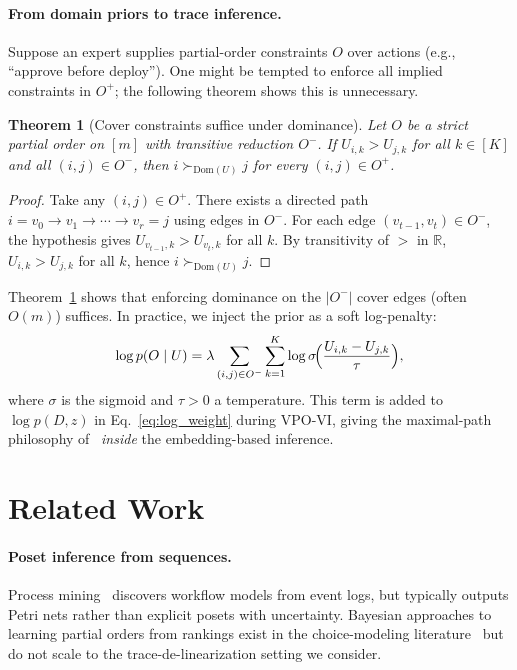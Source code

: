\documentclass{article}
\newtheorem{theorem}{Theorem}
\theoremstyle{definition}
\theoremstyle{remark}
\newcommand{\R}{\mathbb{R}}
\newcommand{\Dom}{\mathrm{Dom}}
\begin{document}
\paragraph{From domain priors to trace inference.}
Suppose an expert supplies partial-order constraints $O$ over actions
(e.g., ``approve before deploy'').
One might be tempted to enforce all implied constraints in $O^+$;
the following theorem shows this is unnecessary.

\begin{theorem}[Cover constraints suffice under dominance]
\label{thm:cover}
Let $O$ be a strict partial order on $[m]$ with transitive reduction
$O^-$.
If $U_{i,k}>U_{j,k}$ for all $k\in[K]$ and all $(i,j)\in O^-$,
then $i\succ_{\Dom(U)}j$ for every $(i,j)\in O^+$.
\end{theorem}
\begin{proof}
Take any $(i,j)\in O^+$.
There exists a directed path $i=v_0\to v_1\to\cdots\to v_r=j$
using edges in $O^-$.
For each edge $(v_{t-1},v_t)\in O^-$, the hypothesis gives
$U_{v_{t-1},k}>U_{v_t,k}$ for all $k$.
By transitivity of $>$ in $\R$,
$U_{i,k}>U_{j,k}$ for all $k$, hence $i\succ_{\Dom(U)}j$.
\end{proof}

Theorem~\ref{thm:cover} shows that enforcing dominance on the
$|O^-|$ cover edges (often $O(m)$) suffices.
In practice, we inject the prior as a soft log-penalty:
\begin{equation}
\log p(O\mid U)
= \lambda\sum_{(i,j)\in O^-}\sum_{k=1}^K
\log\sigma\!\Bigl(\frac{U_{i,k}-U_{j,k}}{\tau}\Bigr),
\label{eq:soft_prior}
\end{equation}
where $\sigma$ is the sigmoid and $\tau>0$ a temperature.
This term is added to $\log p(D,z)$ in Eq.~\eqref{eq:log_weight}
during VPO-VI, giving the maximal-path
philosophy of~\citet{ban2024differentiable} \emph{inside}
the embedding-based inference.

\section{Related Work}
\label{sec:related}

\paragraph{Poset inference from sequences.}
Process mining~\citep{vanderaalst2016process,leemans2013discovering,weijters2006process}
discovers workflow models from event logs, but typically outputs Petri nets
rather than explicit posets with uncertainty.
Bayesian approaches to learning partial orders from rankings exist in the
choice-modeling
literature~\citep{marden1996analyzing} but do not scale to the
trace-de-linearization setting we consider.
\end{document}

